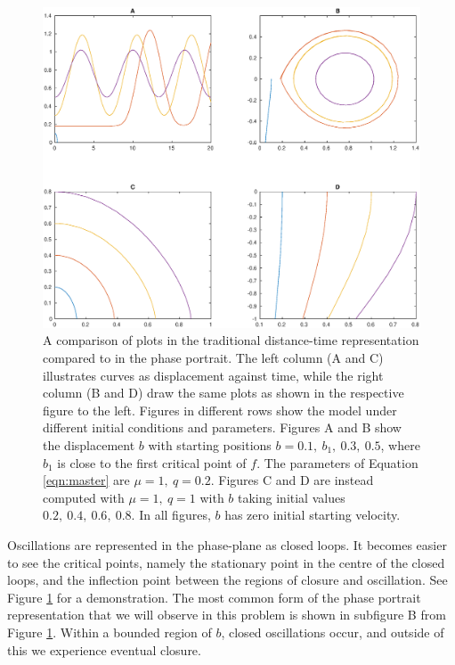 \begin{figure}[h!]
    \centering
    \includegraphics[width=\linewidth]{figures/quadplot_phaseplane_versus_time_2}
    \caption{
        A comparison of plots in the traditional distance-time representation compared to in the phase portrait.
        The left column (A and C) illustrates curves as displacement against time, while the right column (B and D) draw the same plots as shown in the respective figure to the left.
        Figures in different rows show the model under different initial conditions and parameters.
        Figures A and B show the displacement $b$ with starting positions $b=0.1,~b_1,~0.3,~0.5$,
        where $b_1$ is close to the first critical point of $f$. The parameters of Equation \ref{eqn:master} are $\mu=1,~q=0.2$.
        Figures C and D are instead computed with $\mu=1,~q=1$ with $b$ taking initial values $0.2,~0.4,~0.6,~0.8$.
        In all figures, $b$ has zero initial starting velocity.
    }
    \label{fig:phaseportrait_compare}
\end{figure}
Oscillations are represented in the phase-plane as closed loops.
It becomes easier to see the critical points,
namely the stationary point in the centre of the closed loops,
and the inflection point between the regions of closure and oscillation.
See Figure \ref{fig:phaseportrait_compare} for a demonstration.
The most common form of the phase portrait representation that we will observe in this problem is shown in subfigure B from Figure \ref{fig:phaseportrait_compare}.
Within a bounded region of $b$, closed oscillations occur,
and outside of this we experience eventual closure.

